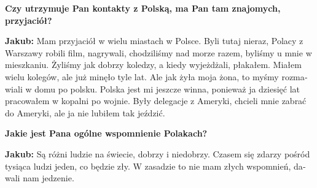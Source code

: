 \begin{otherlanguage}{ngerman}
\textbf{Czy utrzymuje Pan kontakty z Polską, ma Pan tam znajomych, przyjaciół?} 

\textbf{Jakub:} Mam przyjaciół w wielu miastach w Polsce. Byli tutaj nieraz, Polacy z Warszawy robili film, nagrywali, chodziliśmy nad morze razem, byliśmy u mnie w mieszkaniu. Żyliśmy jak dobrzy koledzy, a kiedy wyjeżdżali, płakałem. Miałem wielu kolegów, ale już minęło tyle lat. Ale jak żyła moja żona, to myśmy rozmawiali w domu po polsku. Polska jest mi jeszcze winna, ponieważ ja dziesięć lat pracowałem w kopalni po wojnie. Były delegacje z Ameryki, chcieli mnie zabrać do Ameryki, ale ja nie lubiłem tak jeździć. 

\textbf{Jakie jest Pana ogólne wspomnienie Polakach?}

\textbf{Jakub:} Są różni ludzie na świecie, dobrzy i niedobrzy. Czasem się zdarzy pośród tysiąca ludzi jeden, co będzie zły. W zasadzie to nie mam złych wspomnień, dawali nam jedzenie. 
\end{otherlanguage}